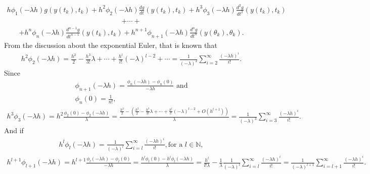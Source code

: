 \documentclass[letterpaper,10pt,english]{jupyterBook}
\begin{document}
\begin{equation*}
\begin{split}
h\phi_1(-\lambda h) g(y(t_k), t_k) +
h^2\phi_2(-\lambda h) \frac{dg}{dt}(y(t_k), t_k) +
h^3\phi_3(-\lambda h)\frac{d^2g}{dt^2} (y(t_k), t_k)
\end{split}
\end{equation*}\begin{equation*}
\begin{split}
+ \dotsi +
\end{split}
\end{equation*}\begin{equation*}
\begin{split}
+ h^n\phi_n(-\lambda h) \frac{d^{n-1}g}{dt^{n-1}} (y(t_k), t_k)+
h^{n+1}\phi_{n+1}(-\lambda h) \frac{d^ng}{dt^n} (y(\theta_k), \theta_k).
\end{split}
\end{equation*}
\sphinxAtStartPar
From the discussion about the exponential Euler, that is known that
\begin{equation*}
\begin{split}
h^2\phi_2(-\lambda h) = \frac{h^2}{2} - \frac{h^3}{3!} \lambda + \dotsi + \frac{h^l}{l!} (-\lambda)^{l-2} + \dotsi = \frac{1}{(-\lambda)^2} \sum\limits_{i=2}^{\infty} \frac{(-\lambda h)^i}{i!}.
\end{split}
\end{equation*}
\sphinxAtStartPar
Since
\begin{equation*}
\begin{split}
  \phi_{n+1}(-\lambda h) = \frac{\phi_n(-\lambda h) - \phi_n(0)}{-\lambda h} \text{ and}\\
  \phi_n(0) = \frac{1}{n!},
\end{split}
\end{equation*}\begin{equation*}
\begin{split}
  h^3 \phi_3(-\lambda h) = h^2 \frac{\phi_2(0) - \phi_2(-\lambda h)}{\lambda} = \frac{\frac{h^2}{2} - (\frac{h^2}{2} - \frac{h^3}{3!} \lambda + \dotsi + \frac{h^l}{l!} (-\lambda)^{l-2} + O(h^{l+1}))}{\lambda} = \frac{1}{(-\lambda)^3} \sum\limits_{i=3}^{\infty} \frac{(-\lambda h)^i}{i!}.
\end{split}
\end{equation*}
\sphinxAtStartPar
And if
\begin{equation*}
\begin{split}
h^l \phi_l(-\lambda h) = \frac{1}{(-\lambda)^l} \sum\limits_{i=l}^{\infty} \frac{(-\lambda h)^i}{i!}, \text{for a } l \in \mathbb{N},
\end{split}
\end{equation*}\begin{equation*}
\begin{split}
  h^{l+1}\phi_{l+1}(-\lambda h) = h^{l+1} \frac{\phi_l(-\lambda h) - \phi_l(0)}{-\lambda h} = \frac{h^l \phi_l(0) - h^l \phi_l(-\lambda h)}{\lambda} = \frac{h^l}{l! \lambda} - \frac{1}{\lambda} \frac{1}{(-\lambda)^l} \sum\limits_{i=l}^{\infty} \frac{(-\lambda h)^i}{i!} = \frac{1}{(-\lambda)^{l+1}} \sum\limits_{i=l+1}^{\infty} \frac{(-\lambda h)^i}{i!}.
\end{split}
\end{equation*}
\end{document}
